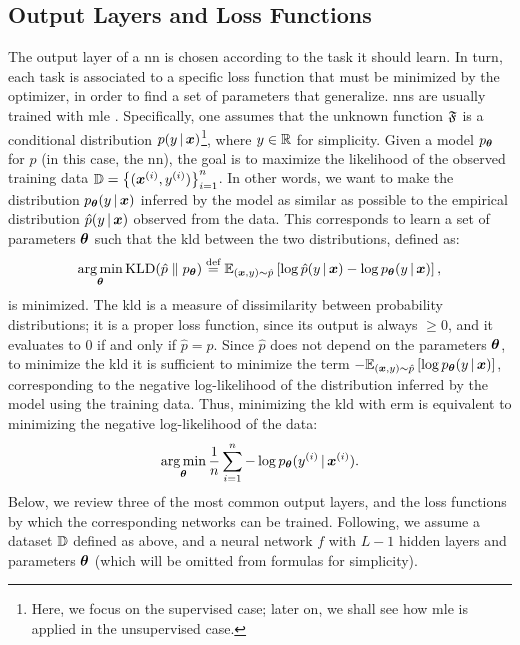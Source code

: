 \subsection{Output Layers and Loss Functions}\label{sec:loss}
The output layer of a \gls{nn} is chosen according to the task it should learn. In turn, each task is associated to a specific loss function that must be minimized by the optimizer, in order to find a set of parameters that generalize. \glspl{nn} are usually trained with \gls{mle} \citep{bishop2006pattern}. Specifically, one assumes that the unknown function $\mathfrak{F}$ is a conditional distribution $p(y\given\Vector{x})$\footnote{Here, we focus on the supervised case; later on, we shall see how \gls{mle} is applied in the unsupervised case.}, where $y \in \mathbb{R}$ for simplicity. Given a model $p_{\boldsymbol{\theta}}$ for $p$ (in this case, the \gls{nn}), the goal is to maximize the likelihood of the observed training data $\Data = \Set{(\PatternVector{x}{i}, \Pattern{y}{i})}_{i=1}^n$. In other words, we want to make the distribution $p_{\Param}(y\given\Vector{x})$ inferred by the model as similar as possible to the empirical distribution $\hat{p}(y\given\Vector{x})$ observed from the data. This corresponds to learn a set of parameters $\boldsymbol{\theta}$ such that the \gls{kld} between the two distributions, defined as:
$$\argmin_{\Param} \KLD{\hat{p}}{p_{\Param}} \defeq \Expectation{(\Vector{x}, y) \sim \hat{p}}{\log \hat{p}(y \given \Vector{x}) - \log p_{\Param}(y \given \Vector{x})},$$
is minimized. The \gls{kld} is a measure of dissimilarity between probability distributions; it is a proper loss function, since its output is always $\ge 0$, and it evaluates to 0 if and only if $\hat{p} = p$. Since $\hat{p}$ does not depend on the parameters $\boldsymbol{\theta}$, to minimize the \gls{kld} it is sufficient to minimize the term $- \Expectation{(\Vector{x}, y) \sim \hat{p}}{\log p_{\Param}(y \given \Vector{x})}$, corresponding to the negative log-likelihood of the distribution inferred by the model using the training data. Thus, minimizing the \gls{kld} with \gls{erm} is equivalent to minimizing the negative log-likelihood of the data:
$$\argmin_{\Param} \frac{1}{n} \sum_{i=1}^n -\log p_{\Param}(\Pattern{y}{i} \given \PatternVector{x}{i}).$$
Below, we review three of the most common output layers, and the loss functions by which the corresponding networks can be trained. Following, we assume a dataset $\mathbb{D}$ defined as above, and a neural network $f$ with $L-1$ hidden layers and parameters $\boldsymbol{\theta}$ (which will be omitted from formulas for simplicity).

